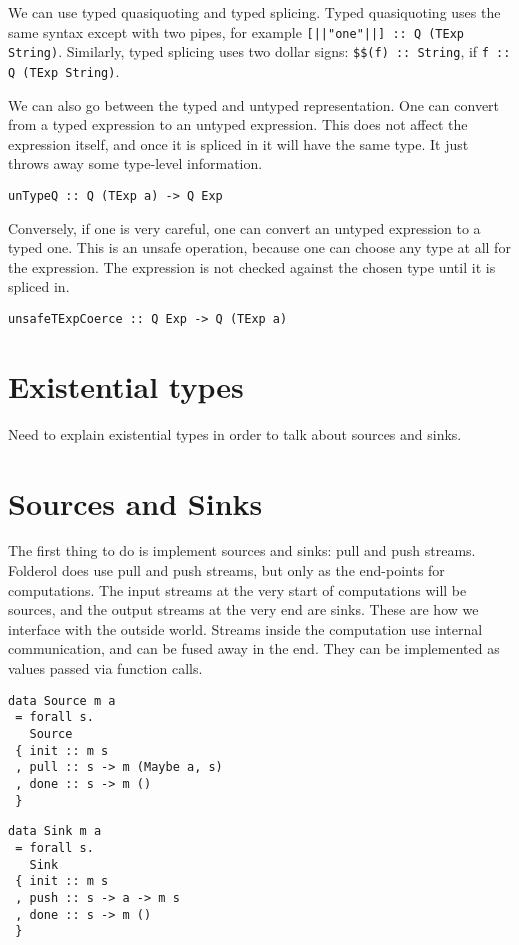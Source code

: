 We can use typed quasiquoting and typed splicing.
Typed quasiquoting uses the same syntax except with two pipes, for example \lstinline/[||"one"||] :: Q (TExp String)/.
Similarly, typed splicing uses two dollar signs: \lstinline/$$(f) :: String/, if \lstinline/f :: Q (TExp String)/.

We can also go between the typed and untyped representation.
One can convert from a typed expression to an untyped expression.
This does not affect the expression itself, and once it is spliced in it will have the same type.
It just throws away some type-level information.

\begin{lstlisting}
unTypeQ :: Q (TExp a) -> Q Exp
\end{lstlisting}

Conversely, if one is very careful, one can convert an untyped expression to a typed one.
This is an unsafe operation, because one can choose any type at all for the expression.
The expression is not checked against the chosen type until it is spliced in.
\begin{lstlisting}
unsafeTExpCoerce :: Q Exp -> Q (TExp a)
\end{lstlisting}

\section{Existential types}
Need to explain existential types in order to talk about sources and sinks.

\section{Sources and Sinks}
The first thing to do is implement sources and sinks: pull and push streams.
Folderol does use pull and push streams, but only as the end-points for computations.
The input streams at the very start of computations will be sources, and the output streams at the very end are sinks.
These are how we interface with the outside world.
Streams inside the computation use internal communication, and can be fused away in the end. They can be implemented as values passed via function calls.

\begin{lstlisting}
data Source m a
 = forall s.
   Source
 { init :: m s
 , pull :: s -> m (Maybe a, s)
 , done :: s -> m ()
 }
\end{lstlisting}

\begin{lstlisting}
data Sink m a
 = forall s.
   Sink
 { init :: m s
 , push :: s -> a -> m s
 , done :: s -> m ()
 }
\end{lstlisting}


